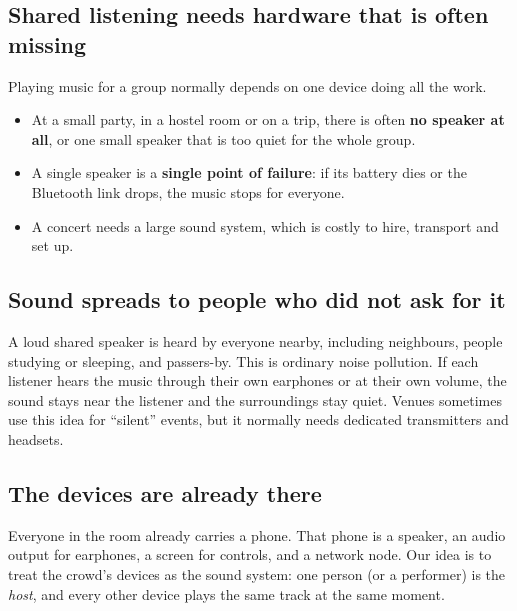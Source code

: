 \documentclass[11pt,a4paper]{article}
\begin{document}
\subsection{Shared listening needs hardware that is often missing}
Playing music for a group normally depends on one device doing all the work.
\begin{itemize}
  \item At a small party, in a hostel room or on a trip, there is often \textbf{no speaker
        at all}, or one small speaker that is too quiet for the whole group.
  \item A single speaker is a \textbf{single point of failure}: if its battery dies or the
        Bluetooth link drops, the music stops for everyone.
  \item A concert needs a large sound system, which is costly to hire, transport and set up.
\end{itemize}

\subsection{Sound spreads to people who did not ask for it}
A loud shared speaker is heard by everyone nearby, including neighbours, people studying
or sleeping, and passers-by. This is ordinary noise pollution. If each listener hears the
music through their own earphones or at their own volume, the sound stays near the
listener and the surroundings stay quiet. Venues sometimes use this idea for ``silent''
events, but it normally needs dedicated transmitters and headsets.

\subsection{The devices are already there}
Everyone in the room already carries a phone. That phone is a speaker, an audio output for
earphones, a screen for controls, and a network node. Our idea is to treat the crowd's
devices as the sound system: one person (or a performer) is the \emph{host}, and every
other device plays the same track at the same moment.
\end{document}
